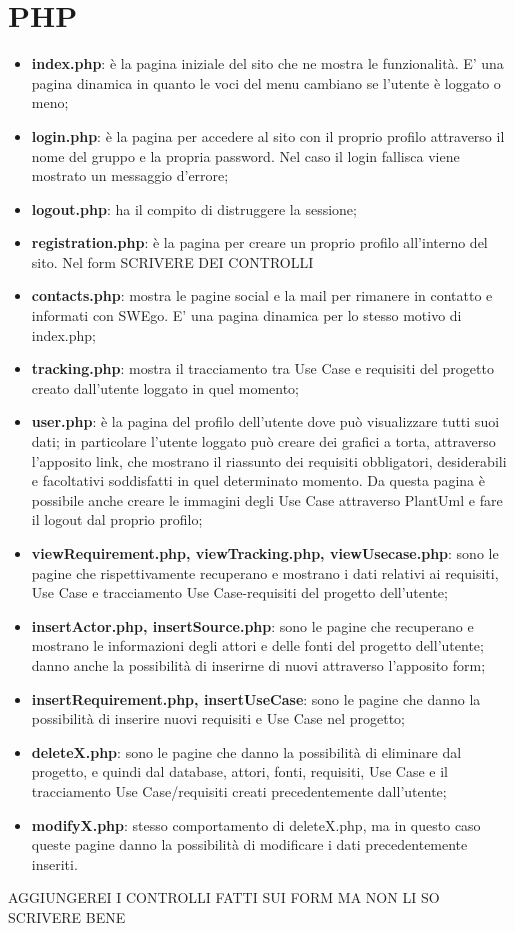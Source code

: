 \section{PHP}

\begin{itemize}
	\item \textbf{index.php}: è la pagina iniziale del sito che ne mostra le funzionalità. E' una pagina dinamica in quanto le voci del menu cambiano se l'utente è loggato o meno;
	\item \textbf{login.php}: è la pagina per accedere al sito con il proprio profilo attraverso il nome del gruppo e la propria password. Nel caso il login fallisca viene mostrato un messaggio d'errore;
	\item \textbf{logout.php}: ha il compito di distruggere la sessione;
	\item \textbf{registration.php}: è la pagina per creare un proprio profilo all'interno del sito. Nel form SCRIVERE DEI CONTROLLI
	\item \textbf{contacts.php}: mostra le pagine social e la mail per rimanere in contatto e informati con SWEgo. E' una pagina dinamica per lo stesso motivo di index.php;
	\item \textbf{tracking.php}: mostra il tracciamento tra Use Case e requisiti del progetto creato dall'utente loggato in quel momento;
	\item \textbf{user.php}: è la pagina del profilo dell'utente dove può visualizzare tutti suoi dati; in particolare l'utente loggato può creare dei grafici a torta, attraverso l'apposito link, che mostrano il riassunto dei requisiti obbligatori, desiderabili e facoltativi soddisfatti in quel determinato momento. Da questa pagina è possibile anche creare le immagini degli Use Case attraverso PlantUml e fare il logout dal proprio profilo;
	\item \textbf{viewRequirement.php, viewTracking.php, viewUsecase.php}: sono le pagine che rispettivamente recuperano e mostrano i dati relativi ai requisiti, Use Case e tracciamento Use Case-requisiti del progetto dell'utente;
	\item \textbf{insertActor.php, insertSource.php}: sono le pagine che recuperano e mostrano le informazioni degli attori e delle fonti del progetto dell'utente; danno anche la possibilità di inserirne di nuovi attraverso l'apposito form;
	\item \textbf{insertRequirement.php, insertUseCase}: sono le pagine che danno la possibilità di inserire nuovi requisiti e Use Case nel progetto;
	\item \textbf{deleteX.php}: sono le pagine che danno la possibilità di eliminare dal progetto, e quindi dal database, attori, fonti, requisiti, Use Case e il tracciamento Use Case/requisiti creati precedentemente dall'utente; 
	\item \textbf{modifyX.php}: stesso comportamento di deleteX.php, ma in questo caso queste pagine danno la possibilità di modificare i dati precedentemente inseriti.
\end{itemize}

AGGIUNGEREI I CONTROLLI FATTI SUI FORM MA NON LI SO SCRIVERE BENE